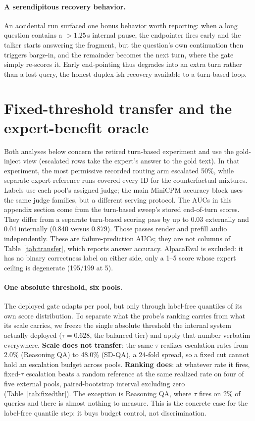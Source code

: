 \paragraph{A serendipitous recovery behavior.}
An accidental run surfaced one bonus behavior worth reporting: when a
long question contains a ${>}1.25$\,s internal pause, the endpointer
fires early and the talker starts answering the fragment, but the
question's own continuation then triggers barge-in, and the remainder
becomes the next turn, where the gate simply re-scores it. Early
end-pointing thus degrades into an extra turn rather than a lost query, the honest duplex-ish recovery available to a turn-based loop.

\section{Fixed-threshold transfer and the expert-benefit oracle}
\label{app:fixedthr}

Both analyses below concern the retired turn-based experiment and
use the gold-inject view (escalated rows take the expert's answer to
the gold text). In that experiment, the most permissive recorded
routing arm escalated 50\%, while separate expert-reference runs
covered every ID for the counterfactual mixtures. Labels use each
pool's assigned judge; the main MiniCPM accuracy block uses the same
judge families, but a different serving protocol.
The AUCs in this appendix section come from the turn-based sweep's
stored end-of-turn scores. They differ from a separate turn-based
scoring pass by up to 0.03 externally and 0.04 internally (0.840
versus 0.879). Those passes render and prefill audio independently.
These are failure-prediction AUCs; they are not columns of
Table~\ref{tab:transfer}, which reports answer accuracy.
AlpacaEval is excluded: it has no binary correctness label on either
side, only a 1--5 score whose expert ceiling is degenerate (195/199 at
5).

\paragraph{One absolute threshold, six pools.}
The deployed gate adapts per pool, but only through label-free
quantiles of its own score distribution. To separate what the probe's
ranking carries from what its scale carries, we freeze
the single absolute threshold the internal system actually deployed
($\tau{=}0.628$, the balanced tier) and apply that number verbatim
everywhere. \textbf{Scale does not transfer}: the same $\tau$ realizes
escalation rates from 2.0\% (Reasoning QA) to 48.0\% (SD-QA), a
24-fold spread, so a fixed cut cannot hold an escalation budget across
pools. \textbf{Ranking does}: at whatever rate it fires, fixed-$\tau$
escalation beats a random reference at the same realized rate on four
of five external pools, paired-bootstrap interval excluding zero
(Table~\ref{tab:fixedthr}). The exception is Reasoning QA, where
$\tau$ fires on 2\% of queries and there is almost nothing to measure.
This is the concrete case for the label-free quantile step: it buys
budget control, not discrimination.

